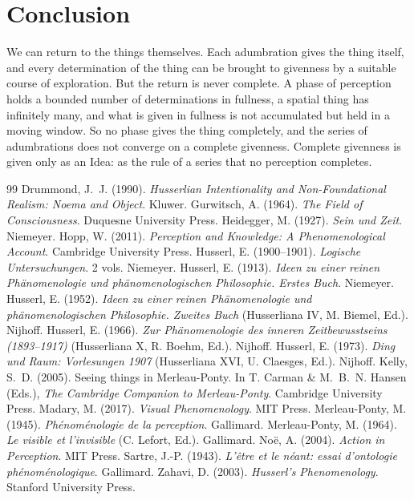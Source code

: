 \documentclass{situationist-preprint}
\begin{document}
\section{Conclusion}

We can return to the things themselves. Each adumbration gives the thing itself, and every determination of the thing can be brought to givenness by a suitable course of exploration. But the return is never complete. A phase of perception holds a bounded number of determinations in fullness, a spatial thing has infinitely many, and what is given in fullness is not accumulated but held in a moving window. So no phase gives the thing completely, and the series of adumbrations does not converge on a complete givenness. Complete givenness is given only as an Idea: as the rule of a series that no perception completes.

\begin{thebibliography}{99}\small
{} Drummond, J.~J. (1990). \emph{Husserlian Intentionality and Non-Foundational Realism: Noema and Object}. Kluwer.
 Gurwitsch, A. (1964). \emph{The Field of Consciousness}. Duquesne University Press.
 Heidegger, M. (1927). \emph{Sein und Zeit}. Niemeyer.
 Hopp, W. (2011). \emph{Perception and Knowledge: A Phenomenological Account}. Cambridge University Press.
 Husserl, E. (1900--1901). \emph{Logische Untersuchungen}. 2 vols. Niemeyer.
 Husserl, E. (1913). \emph{Ideen zu einer reinen Phänomenologie und phänomenologischen Philosophie. Erstes Buch}. Niemeyer.
 Husserl, E. (1952). \emph{Ideen zu einer reinen Phänomenologie und phänomenologischen Philosophie. Zweites Buch} (Husserliana IV, M. Biemel, Ed.). Nijhoff.
 Husserl, E. (1966). \emph{Zur Phänomenologie des inneren Zeitbewusstseins (1893--1917)} (Husserliana X, R. Boehm, Ed.). Nijhoff.
 Husserl, E. (1973). \emph{Ding und Raum: Vorlesungen 1907} (Husserliana XVI, U. Claesges, Ed.). Nijhoff.
 Kelly, S.~D. (2005). Seeing things in Merleau-Ponty. In T. Carman \& M.~B.~N. Hansen (Eds.), \emph{The Cambridge Companion to Merleau-Ponty}. Cambridge University Press.
 Madary, M. (2017). \emph{Visual Phenomenology}. MIT Press.
 Merleau-Ponty, M. (1945). \emph{Phénoménologie de la perception}. Gallimard.
 Merleau-Ponty, M. (1964). \emph{Le visible et l'invisible} (C. Lefort, Ed.). Gallimard.
 Noë, A. (2004). \emph{Action in Perception}. MIT Press.
 Sartre, J.-P. (1943). \emph{L'être et le néant: essai d'ontologie phénoménologique}. Gallimard.
 Zahavi, D. (2003). \emph{Husserl's Phenomenology}. Stanford University Press.
\end{thebibliography}
\end{document}
